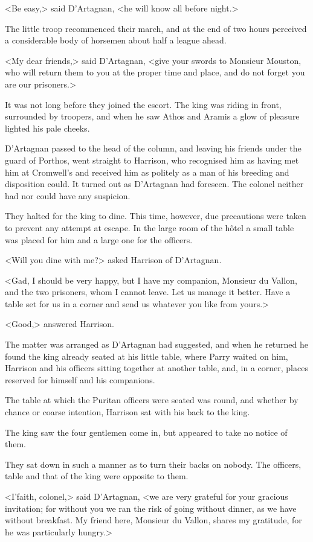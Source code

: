 <Be easy,> said D'Artagnan, <he will know all before night.>

The little troop recommenced their march, and at the end of two hours perceived a considerable body of horsemen about half a league ahead.

<My dear friends,> said D'Artagnan, <give your swords to Monsieur Mouston, who will return them to you at the proper time and place, and do not forget you are our prisoners.>

It was not long before they joined the escort. The king was riding in front, surrounded by troopers, and when he saw Athos and Aramis a glow of pleasure lighted his pale cheeks.

D'Artagnan passed to the head of the column, and leaving his friends under the guard of Porthos, went straight to Harrison, who recognised him as having met him at Cromwell's and received him as politely as a man of his breeding and disposition could. It turned out as D'Artagnan had foreseen. The colonel neither had nor could have any suspicion.

They halted for the king to dine. This time, however, due precautions were taken to prevent any attempt at escape. In the large room of the hôtel a small table was placed for him and a large one for the officers.

<Will you dine with me?> asked Harrison of D'Artagnan.

<Gad, I should be very happy, but I have my companion, Monsieur du Vallon, and the two prisoners, whom I cannot leave. Let us manage it better. Have a table set for us in a corner and send us whatever you like from yours.>

<Good,> answered Harrison.

The matter was arranged as D'Artagnan had suggested, and when he returned he found the king already seated at his little table, where Parry waited on him, Harrison and his officers sitting together at another table, and, in a corner, places reserved for himself and his companions.

The table at which the Puritan officers were seated was round, and whether by chance or coarse intention, Harrison sat with his back to the king.

The king saw the four gentlemen come in, but appeared to take no notice of them.

They sat down in such a manner as to turn their backs on nobody. The officers, table and that of the king were opposite to them.

<I'faith, colonel,> said D'Artagnan, <we are very grateful for your gracious invitation; for without you we ran the risk of going without dinner, as we have without breakfast. My friend here, Monsieur du Vallon, shares my gratitude, for he was particularly hungry.>

